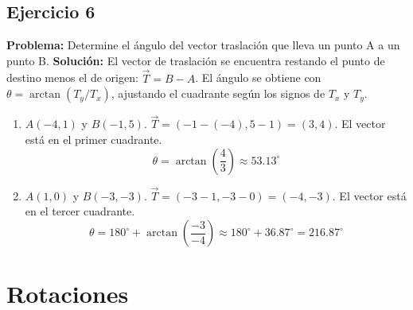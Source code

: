 \documentclass[12pt, letterpaper]{article}
\begin{document}
\subsection{Ejercicio 6}
\textbf{Problema:} Determine el ángulo del vector traslación que lleva un punto A a un punto B.
\textbf{Solución:} El vector de traslación se encuentra restando el punto de destino menos el de origen: $\vec{T} = B - A$. El ángulo se obtiene con $\theta = \arctan(T_y/T_x)$, ajustando el cuadrante según los signos de $T_x$ y $T_y$.
\begin{enumerate}[label=\alph*)]
    \item $A(-4,1)$ y $B(-1,5)$. $\vec{T} = (-1 - (-4), 5 - 1) = (3, 4)$. El vector está en el primer cuadrante.
    \[ \theta = \arctan\left(\frac{4}{3}\right) \approx \mathbf{53.13^\circ} \]
    \item $A(1,0)$ y $B(-3,-3)$. $\vec{T} = (-3 - 1, -3 - 0) = (-4, -3)$. El vector está en el tercer cuadrante.
    \[ \theta = 180^\circ + \arctan\left(\frac{-3}{-4}\right) \approx 180^\circ + 36.87^\circ = \mathbf{216.87^\circ} \]
\end{enumerate}

\newpage
\section{Rotaciones}
\end{document}
